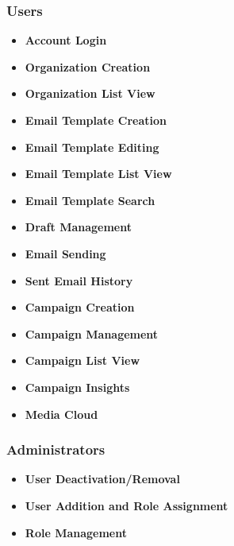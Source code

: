 \subsubsection{Users}
\begin{itemize}
\item \textbf{Account Login}
\item \textbf{Organization Creation}
\item \textbf{Organization List View}
\item \textbf{Email Template Creation}
\item \textbf{Email Template Editing}
\item \textbf{Email Template List View}
\item \textbf{Email Template Search}
\item \textbf{Draft Management}
\item \textbf{Email Sending}
\item \textbf{Sent Email History}
\item \textbf{Campaign Creation}
\item \textbf{Campaign Management}
\item \textbf{Campaign List View}
\item \textbf{Campaign Insights}
\item \textbf{Media Cloud}
\end{itemize}

\subsubsection{Administrators}
\begin{itemize}
\item \textbf{User Deactivation/Removal}
\item \textbf{User Addition and Role Assignment}
\item \textbf{Role Management}
\end{itemize}


